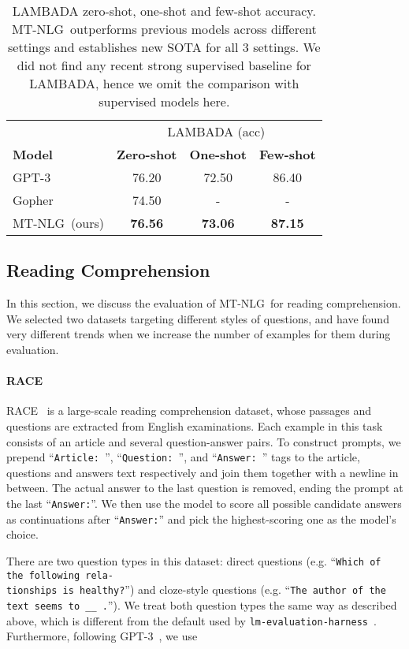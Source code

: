 \documentclass[11pt]{article}
\newcommand{\ours}{MT-NLG}
\begin{document}
\begin{table}[t]
\centering
\small
\begin{tabular}{l c c c}
 \toprule
 & \multicolumn{3}{c}{LAMBADA (acc)} \\
 \cmidrule{2-4}
 \textbf{Model} &  \textbf{Zero-shot}  &  \textbf{One-shot} &  \textbf{Few-shot} \\
 \midrule
 GPT-3  &   76.20   &   72.50   &   86.40  \\
 Gopher  &   74.50   &   -   &   -  \\
 \ours~(ours)	&	\textbf{76.56}	&	\textbf{73.06}	&	\textbf{87.15}	\\
 \bottomrule
\end{tabular}
\caption{LAMBADA zero-shot, one-shot and few-shot accuracy. \ours~outperforms previous models across different settings and establishes new SOTA for all 3 settings. We did not find any recent strong supervised baseline for LAMBADA, hence we omit the comparison with supervised models here.}
\label{tab:lambada-perf}
\end{table}


\subsection{Reading Comprehension}

In this section, we discuss the evaluation of \ours~for reading comprehension. We selected two datasets targeting different styles of questions, and have found very different trends when we increase the number of examples for them during evaluation.

\paragraph{RACE} RACE~\citep{lai-etal-2017-race} is a large-scale reading comprehension dataset, whose passages and questions are extracted from English examinations. Each example in this task consists of an article and several question-answer pairs. To construct prompts, we prepend ``\texttt{Article: }'', ``\texttt{Question: }'', and ``\texttt{Answer: }'' tags to the article, questions and answers text respectively and join them together with a newline in between. The actual answer to the last question is removed, ending the prompt at the last ``\texttt{Answer:}''. We then use the model to score all possible candidate answers as continuations after ``\texttt{Answer:}'' and pick the highest-scoring one as the model's choice.

There are two question types in this dataset: direct questions (e.g. ``\texttt{Which of the following rela-\\tionships is healthy?}'') and cloze-style questions (e.g. ``\texttt{The author of the text seems to \_\_ .}''). We treat both question types the same way as described above, which is different from the default used by \texttt{lm-evaluation-harness}~\citep{eval-harness}. Furthermore, following GPT-3~\citep{brown2020language}, we use
\end{document}
